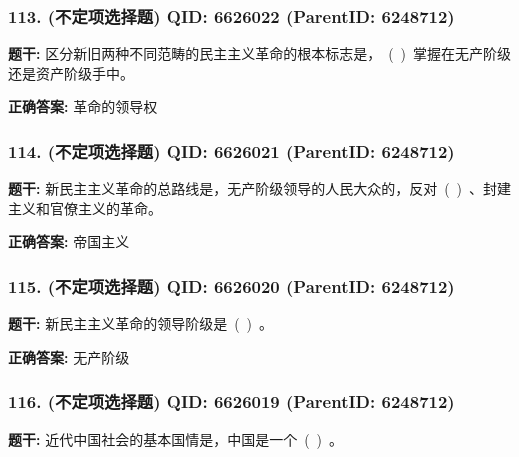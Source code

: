 \documentclass[12pt,UTF8]{ctexart}
\begin{document}
\vspace{0.3em}\hrulefill\vspace{0.7em}

\subsubsection*{113. (不定项选择题) \small QID: 6626022 (ParentID: 6248712)}

\textbf{题干:}
区分新旧两种不同范畴的民主主义革命的根本标志是， ( ) 掌握在无产阶级还是资产阶级手中。



\textbf{正确答案:}
革命的领导权

\vspace{0.3em}\hrulefill\vspace{0.7em}

\subsubsection*{114. (不定项选择题) \small QID: 6626021 (ParentID: 6248712)}

\textbf{题干:}
新民主主义革命的总路线是，无产阶级领导的人民大众的，反对 ( ) 、封建主义和官僚主义的革命。



\textbf{正确答案:}
帝国主义

\vspace{0.3em}\hrulefill\vspace{0.7em}

\subsubsection*{115. (不定项选择题) \small QID: 6626020 (ParentID: 6248712)}

\textbf{题干:}
新民主主义革命的领导阶级是 ( ) 。



\textbf{正确答案:}
无产阶级

\vspace{0.3em}\hrulefill\vspace{0.7em}

\subsubsection*{116. (不定项选择题) \small QID: 6626019 (ParentID: 6248712)}

\textbf{题干:}
近代中国社会的基本国情是，中国是一个 ( ) 。
\end{document}
